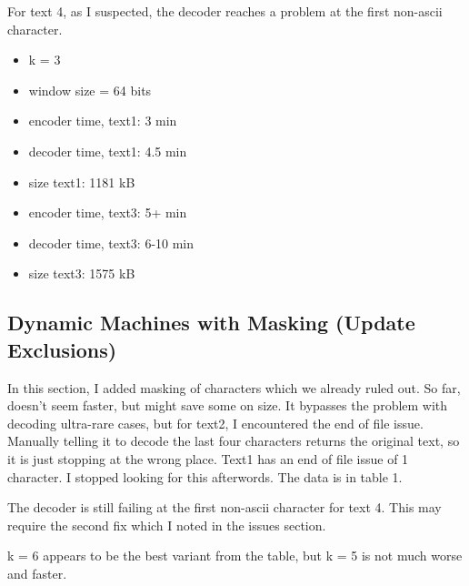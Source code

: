 \documentclass{article}
\begin{document}
For text 4, as I suspected, the decoder reaches a problem at the first non-ascii character.


\begin{itemize}
\item k = 3
\item window size = 64 bits
\item encoder time, text1: 3 min
\item decoder time, text1: 4.5 min
\item size text1: 1181 kB
\item encoder time, text3: 5+ min
\item decoder time, text3: 6-10 min
\item size text3: 1575 kB
\end{itemize}



\subsection{Dynamic Machines with Masking (Update Exclusions)}

In this section, I added masking of characters which we already ruled out. So far, doesn't seem faster, but might save some on size. It bypasses the problem with decoding ultra-rare cases, but for text2, I encountered the end of file issue. Manually telling it to decode the last four characters returns the original text, so it is just stopping at the wrong place. Text1 has an end of file issue of 1 character. I stopped looking for this afterwords. The data is in table 1.

The decoder is still failing at the first non-ascii character for text 4. This may require the second fix which I noted in the issues section.

k = 6 appears to be the best variant from the table, but k = 5 is not much worse and faster.
\end{document}

